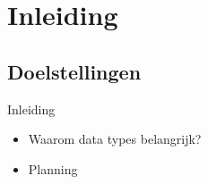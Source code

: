 \documentclass{beamer}
\begin{document}
\section{Inleiding}
\subsection{Doelstellingen}
\begin{frame}{Inleiding}

\begin{itemize}
    \item Waarom data types belangrijk?
    \item Planning
\end{itemize}




\end{frame}
\end{document}
